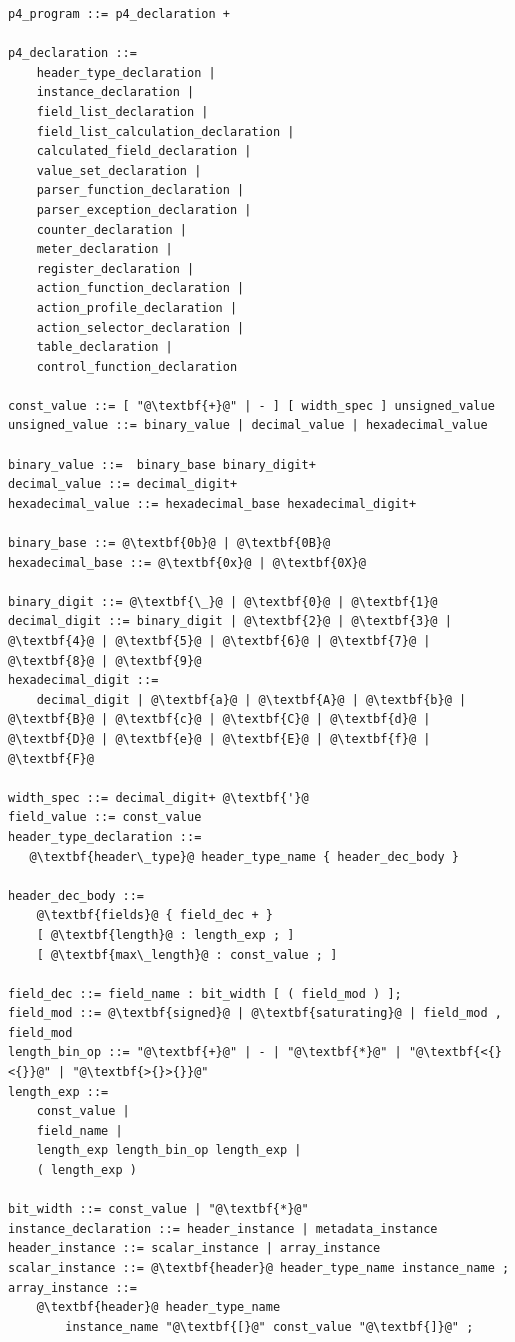 \documentclass[12pt]{article}
\begin{document}
\begin{lstlisting}[frame=single,backgroundcolor=\color{bnfgreen},escapechar=\@]
p4_program ::= p4_declaration +

p4_declaration ::=
    header_type_declaration | 
    instance_declaration |
    field_list_declaration |
    field_list_calculation_declaration |
    calculated_field_declaration |
    value_set_declaration |
    parser_function_declaration |
    parser_exception_declaration |
    counter_declaration |
    meter_declaration |
    register_declaration |
    action_function_declaration |
    action_profile_declaration |
    action_selector_declaration |
    table_declaration |
    control_function_declaration

const_value ::= [ "@\textbf{+}@" | - ] [ width_spec ] unsigned_value
unsigned_value ::= binary_value | decimal_value | hexadecimal_value

binary_value ::=  binary_base binary_digit+
decimal_value ::= decimal_digit+
hexadecimal_value ::= hexadecimal_base hexadecimal_digit+

binary_base ::= @\textbf{0b}@ | @\textbf{0B}@
hexadecimal_base ::= @\textbf{0x}@ | @\textbf{0X}@

binary_digit ::= @\textbf{\_}@ | @\textbf{0}@ | @\textbf{1}@
decimal_digit ::= binary_digit | @\textbf{2}@ | @\textbf{3}@ | @\textbf{4}@ | @\textbf{5}@ | @\textbf{6}@ | @\textbf{7}@ | @\textbf{8}@ | @\textbf{9}@
hexadecimal_digit ::= 
    decimal_digit | @\textbf{a}@ | @\textbf{A}@ | @\textbf{b}@ | @\textbf{B}@ | @\textbf{c}@ | @\textbf{C}@ | @\textbf{d}@ | @\textbf{D}@ | @\textbf{e}@ | @\textbf{E}@ | @\textbf{f}@ | @\textbf{F}@

width_spec ::= decimal_digit+ @\textbf{'}@
field_value ::= const_value
header_type_declaration ::= 
   @\textbf{header\_type}@ header_type_name { header_dec_body }

header_dec_body ::=
    @\textbf{fields}@ { field_dec + }
    [ @\textbf{length}@ : length_exp ; ]
    [ @\textbf{max\_length}@ : const_value ; ]

field_dec ::= field_name : bit_width [ ( field_mod ) ];
field_mod ::= @\textbf{signed}@ | @\textbf{saturating}@ | field_mod , field_mod
length_bin_op ::= "@\textbf{+}@" | - | "@\textbf{*}@" | "@\textbf{<{}<{}}@" | "@\textbf{>{}>{}}@"
length_exp ::=
    const_value |
    field_name |
    length_exp length_bin_op length_exp |
    ( length_exp )

bit_width ::= const_value | "@\textbf{*}@"
instance_declaration ::= header_instance | metadata_instance
header_instance ::= scalar_instance | array_instance
scalar_instance ::= @\textbf{header}@ header_type_name instance_name ;
array_instance ::=
    @\textbf{header}@ header_type_name 
        instance_name "@\textbf{[}@" const_value "@\textbf{]}@" ;


\end{lstlisting}
\end{document}
